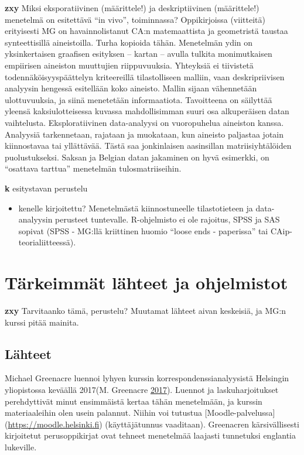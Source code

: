 \documentclass[
  finnish,
]{book}
\providecommand{\tightlist}{%
  \setlength{\itemsep}{0pt}\setlength{\parskip}{0pt}}
\begin{document}
\textbf{zxy} Miksi eksporatiivinen (määrittele!) ja deskriptiivinen
(määrittele!) menetelmä on esitettävä ``in vivo'', toiminnassa?
Oppikirjoissa (viitteitä) erityisesti MG on havainnolistanut CA:n
matemaattista ja geometristä taustaa synteettisillä aineistoilla. Turha
kopioida tähän. Menetelmän ydin on yksinkertaisen graafisen esityksen --
kartan -- avulla tulkita monimutkaisen empiirisen aineiston muuttujien
riippuvuuksia. Yhteyksiä ei tiivistetä todennäköisyyspäättelyn
kriteereillä tilastolliseen malliin, vaan deskripriivisen analyysin
hengessä esitellään koko aineisto. Mallin sijaan vähennetään
ulottuvuuksia, ja siinä menetetään informaatiota. Tavoitteena on
säilyttää yleensä kaksiulotteisessa kuvassa mahdollisimman suuri osa
alkuperäisen datan vaihtelusta. Eksploratiivinen data-analyysi on
vuoropuhelua aineiston kanssa. Analyysiä tarkennetaan, rajataan ja
muokataan, kun aineisto paljastaa jotain kiinnostavaa tai yllättävää.
Tästä saa jonkinlaisen aasinsillan matriisiyhtälöiden puolustukseksi.
Saksan ja Belgian datan jakaminen on hyvä esimerkki, on ``osattava
tarttua'' menetelmän tulosmatriiseihin.

\textbf{k} esitystavan perustelu

\begin{itemize}
\tightlist
\item
  kenelle kirjoitettu? Menetelmästä kiinnostuneelle tilastotieteen ja
  data-analyysin perusteet tuntevalle. R-ohjelmisto ei ole rajoitus,
  SPSS ja SAS sopivat (SPSS - MG:llä kriittinen huomio ``loose ends -
  paperissa'' tai CAip-teorialiitteessä).
\end{itemize}

\hypertarget{tuxe4rkeimmuxe4t-luxe4hteet-ja-ohjelmistot}{%
\section{Tärkeimmät lähteet ja
ohjelmistot}\label{tuxe4rkeimmuxe4t-luxe4hteet-ja-ohjelmistot}}

\textbf{zxy} Tarvitaanko tämä, perustelu? Muutamat lähteet aivan
keskeisiä, ja MG:n kurssi pitää mainita.

\hypertarget{luxe4hteet}{%
\subsection{Lähteet}\label{luxe4hteet}}

Michael Greenacre luennoi lyhyen kurssin korrespondenssianalyysistä
Helsingin yliopistossa keväällä 2017(M. Greenacre
\protect\hyperlink{ref-RefWorks:doc:5b6ef091e4b0984fd9b8c0ca}{2017}).
Luennot ja laskuharjoitukset perehdyttivät minut ensimmäistä kertaa
tähän menetelmään, ja kurssin materiaaleihin olen usein palannut. Niihin
voi tutustua {[}Moodle-palvelussa{]} (\url{https://moodle.helsinki.fi})
(käyttäjätunnus vaaditaan). Greenacren kärsivällisesti kirjoitetut
perusoppikirjat ovat tehneet menetelmää laajasti tunnetuksi englantia
lukeville.
\end{document}
